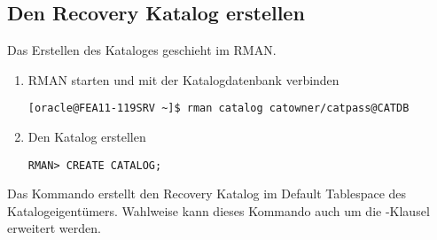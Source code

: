       \subsection{Den Recovery Katalog erstellen}
        Das Erstellen des Kataloges geschieht im RMAN.
        \begin{enumerate}
          \item RMAN starten und mit der Katalogdatenbank verbinden
            \begin{lstlisting}[caption={Mit der Katalogdatenbank verbinden},label=admin1205,language=rman,language=terminal]
[oracle@FEA11-119SRV ~]$ rman catalog catowner/catpass@CATDB
            \end{lstlisting}
          \item Den Katalog erstellen
            \begin{lstlisting}[caption={Katalog erstellen},label=admin1206,language=rman]
RMAN> CREATE CATALOG;
            \end{lstlisting}
        \end{enumerate}
        Das Kommando  erstellt den Recovery Katalog im Default Tablespace des Katalogeigentümers. Wahlweise kann dieses Kommando auch um die -Klausel erweitert werden.
